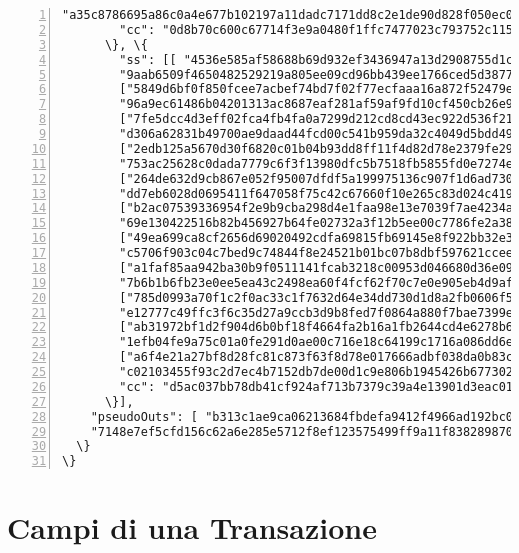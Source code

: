\begin{appendices}
\begin{Verbatim}[commandchars=\\\{\}, numbers=left]
        "a35c8786695a86c0a4e677b102197a11dadc7171dd8c2e1de90d828f050ec00f"]], 
        "cc": "0d8b70c600c67714f3e9a0480f1ffc7477023c793752c1152d5df0813f75ff0f"
      \}, \{
        "ss": [[ "4536e585af58688b69d932ef3436947a13d2908755d1c644ca9d6a978f0f0206",
        "9aab6509f4650482529219a805ee09cd96bb439ee1766ced5d3877bf1518370b"],
        ["5849d6bf0f850fcee7acbef74bd7f02f77ecfaaa16a872f52479ebd27339760f",
        "96a9ec61486b04201313ac8687eaf281af59af9fd10cf450cb26e9dc8f1ce804"],
        ["7fe5dcc4d3eff02fca4fb4fa0a7299d212cd8cd43ec922d536f21f92c8f93f00",
        "d306a62831b49700ae9daad44fcd00c541b959da32c4049d5bdd49be28d96701"],
        ["2edb125a5670d30f6820c01b04b93dd8ff11f4d82d78e2379fe29d7a68d9c103",
        "753ac25628c0dada7779c6f3f13980dfc5b7518fb5855fd0e7274e3075a3410c"],
        ["264de632d9cb867e052f95007dfdf5a199975136c907f1d6ad73061938f49c01",
        "dd7eb6028d0695411f647058f75c42c67660f10e265c83d024c4199bed073d01"],
        ["b2ac07539336954f2e9b9cba298d4e1faa98e13e7039f7ae4234ac801641340f",
        "69e130422516b82b456927b64fe02732a3f12b5ee00c7786fe2a381325bf3004"],
        ["49ea699ca8cf2656d69020492cdfa69815fb69145e8f922bb32e358c23cebb0f",
        "c5706f903c04c7bed9c74844f8e24521b01bc07b8dbf597621cceeeb3afc1d0c"],
        ["a1faf85aa942ba30b9f0511141fcab3218c00953d046680d36e09c35c04be905",
        "7b6b1b6fb23e0ee5ea43c2498ea60f4fcf62f70c7e0e905eb4d9afa1d0a18800"],
        ["785d0993a70f1c2f0ac33c1f7632d64e34dd730d1d8a2fb0606f5770ed633506",
        "e12777c49ffc3f6c35d27a9ccb3d9b8fed7f0864a880f7bae7399e334207280e"],
        ["ab31972bf1d2f904d6b0bf18f4664fa2b16a1fb2644cd4e6278b63ade87b6d09",
        "1efb04fe9a75c01a0fe291d0ae00c716e18c64199c1716a086dd6e32f63e0a07"],
        ["a6f4e21a27bf8d28fc81c873f63f8d78e017666adbf038da0b83c2ad04ef6805",
        "c02103455f93c2d7ec4b7152db7de00d1c9e806b1945426b6773026b4a85dd03"]], 
        "cc": "d5ac037bb78db41cf924af713b7379c39a4e13901d3eac017238550a1a3b910a"
      \}],
    "pseudoOuts": [ "b313c1ae9ca06213684fbdefa9412f4966ad192bc0b2f74ed1731381adb7ab58",
    "7148e7ef5cfd156c62a6e285e5712f8ef123575499ff9a11f838289870522423"]
  \}
\}
\end{Verbatim}



\section*{Campi di una Transazione}


\end{appendices}
